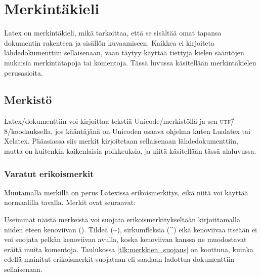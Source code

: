 
\chapter{Merkintäkieli}

Latex on merkintäkieli, mikä tarkoittaa, että se sisältää omat tapansa
dokumentin rakenteen ja sisällön kuvaamiseen. Kaikkea ei kirjoiteta
lähdedokumenttiin sellaisenaan, vaan täytyy käyttää tiettyjä kielen
sääntöjen mukaisia merkintätapoja tai komentoja. Tässä luvussa
käsitellään merkintäkielen perus\-asioita.

\section{Merkistö}

Latex\-/dokumenttiin voi kirjoittaa tekstiä Unicode\-/merkistöllä ja sen
\textsc{utf}\=/8\-/koodauksella, jos kääntäjänä on Unicoden osaava
ohjelma kuten Lualatex tai Xelatex. Pääasiassa siis merkit kirjoitetaan
sellaisenaan lähdedokumenttiin, mutta on kuitenkin kaikenlaisia
poikkeuksia, ja niitä käsitellään tässä alaluvussa.

\subsection{Varatut erikoismerkit}

Muutamalla merkillä on perus Latexissa erikoismerkitys, eikä niitä voi
käyttää normaalilla tavalla. Merkit ovat seuraavat:

\begin{koodilohkosis}
\end{koodilohkosis}

Useimmat näistä merkeistä voi suojata erikoismerkitykseltään
kirjoittamalla niiden eteen kenoviivan (\koodi{\keno}). Tildeä
(\textasciitilde), sirkumfleksia (\textasciicircum) eikä kenoviivaa
itseään ei voi suojata pelkän kenoviivan avulla, koska kenoviivan kanssa
ne muodostavat eräitä muita komentoja. Taulukossa
\ref{tlk:merkkien_suojaus} on koottuna, kuinka edellä mainitut
erikoismerkit suojataan eli saadaan ladottua dokumenttiin sellaisenaan.

